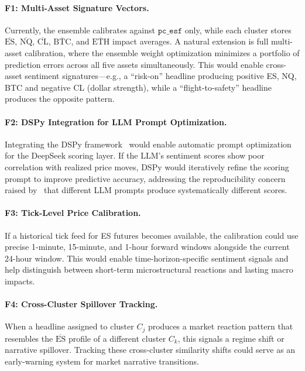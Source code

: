 \paragraph{F1: Multi-Asset Signature Vectors.} Currently, the ensemble calibrates against $\texttt{pc\_esf}$ only, while each cluster stores $\overline{\text{ES}}$, $\overline{\text{NQ}}$, $\overline{\text{CL}}$, $\overline{\text{BTC}}$, and $\overline{\text{ETH}}$ impact averages. A natural extension is full multi-asset calibration, where the ensemble weight optimization minimizes a portfolio of prediction errors across all five assets simultaneously. This would enable cross-asset sentiment signatures---e.g., a ``risk-on'' headline producing positive ES, NQ, BTC and negative CL (dollar strength), while a ``flight-to-safety'' headline produces the opposite pattern.

\paragraph{F2: DSPy Integration for LLM Prompt Optimization.} Integrating the DSPy framework~\cite{dspy2024} would enable automatic prompt optimization for the DeepSeek scoring layer. If the LLM's sentiment scores show poor correlation with realized price moves, DSPy would iteratively refine the scoring prompt to improve predictive accuracy, addressing the reproducibility concern raised by~\citet{kirtac2025llmfinance} that different LLM prompts produce systematically different scores.

\paragraph{F3: Tick-Level Price Calibration.} If a historical tick feed for ES futures becomes available, the calibration could use precise 1-minute, 15-minute, and 1-hour forward windows alongside the current 24-hour window. This would enable time-horizon-specific sentiment signals and help distinguish between short-term microstructural reactions and lasting macro impacts.

\paragraph{F4: Cross-Cluster Spillover Tracking.} When a headline assigned to cluster $C_j$ produces a market reaction pattern that resembles the $\overline{\text{ES}}$ profile of a different cluster $C_k$, this signals a regime shift or narrative spillover. Tracking these cross-cluster similarity shifts could serve as an early-warning system for market narrative transitions.

